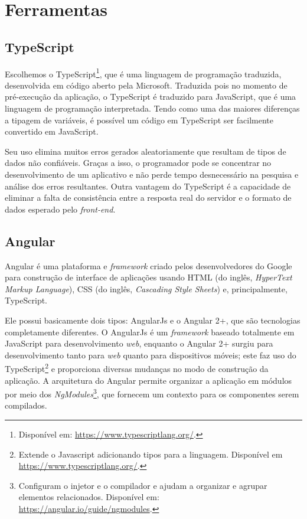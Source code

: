 \section{Ferramentas}
\label{sec:ferramentas}

\subsection{TypeScript}
\label{ssec:TypeScript}
Escolhemos o TypeScript\footnote{Disponível em: \url{https://www.typescriptlang.org/}.}, que é uma linguagem de programação traduzida, desenvolvida em código aberto pela Microsoft. Traduzida pois no momento de pré-execução da aplicação, o TypeScript é traduzido para JavaScript, que é uma linguagem de programação interpretada. Tendo como uma das maiores diferenças a tipagem de variáveis, é possível um código em TypeScript ser facilmente convertido em JavaScript. 

Seu uso elimina muitos erros gerados aleatoriamente que resultam de tipos de dados não confiáveis. Graças a isso, o programador pode se concentrar no desenvolvimento de um aplicativo e não perde tempo desnecessário na pesquisa e análise dos erros resultantes. Outra vantagem do TypeScript é a capacidade de eliminar a falta de consistência entre a resposta real do servidor e o formato de dados esperado pelo \textit{front-end}. \cite{Jakub2019TypeScript}

\subsection{Angular}
\label{ssec:Angular}
Angular\cite{afonso2018angular} é uma plataforma e \textit{framework} criado pelos desenvolvedores do Google para construção de interface de aplicações usando HTML (do inglês, \textit{HyperText Markup Language}), CSS (do inglês, \textit{Cascading Style Sheets}) e, principalmente, TypeScript. 

Ele possui basicamente dois tipos: AngularJs e o Angular 2+, que são tecnologias completamente diferentes. O AngularJs é um \textit{framework} baseado totalmente em JavaScript para desenvolvimento \textit{web}, enquanto o Angular 2+ surgiu para desenvolvimento tanto para \textit{web} quanto para dispositivos móveis; este faz uso do TypeScript\footnote{Extende o Javascript adicionando tipos para a linguagem. Disponível em \url{https://www.typescriptlang.org/}.} e proporciona diversas mudanças no modo de construção da aplicação. A arquitetura do Angular permite organizar a aplicação em módulos por meio dos \textit{NgModules}\footnote{Configuram o injetor e o compilador e ajudam a organizar e agrupar elementos relacionados. Disponível em: \url{https://angular.io/guide/ngmodules}.}, que fornecem um contexto para os componentes serem compilados.

